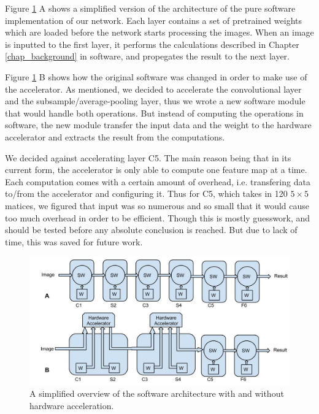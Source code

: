 Figure \ref{fig_software_architecture} A shows a simplified version of the architecture of the pure software implementation of our network. Each layer contains a set of pretrained weights which are loaded before the network starts processing the images. When an image is inputted to the first layer, it performs the calculations described in Chapter \ref{chap_background} in software, and propegates the result to the next layer. 

Figure \ref{fig_software_architecture} B shows how the original software was changed in order to make use of the accelerator. As mentioned, we decided to accelerate the convolutional layer and the subsample/average-pooling layer, thus we wrote a new software module that would handle both operations. But instead of computing the operations in software, the new module transfer the input data and the weight to the hardware accelerator and extracts the result from the computations. 

We decided against accelerating layer C5. The main reason being that in its current form, the accelerator is only able to compute one feature map at a time. Each computation comes with a certain amount of overhead, i.e. transfering data to/from the accelerator and configuring it. Thus for C5, which takes in 120 $ 5 \times 5 $ matices, we figured that input was so numerous and so small that it would cause too much overhead in order to be efficient. Though this is mostly guesswork, and should be tested before any absolute conclusion is reached. But due to lack of time, this was saved for future work. 


\begin{figure}[h!]
  \centering
      \includegraphics[width=1.0\textwidth]{Figures/Method/SoftwareArchitecture}
    \caption{A simplified overview of the software architecture with and without hardware acceleration.}
    \label{fig_software_architecture}
\end{figure}

